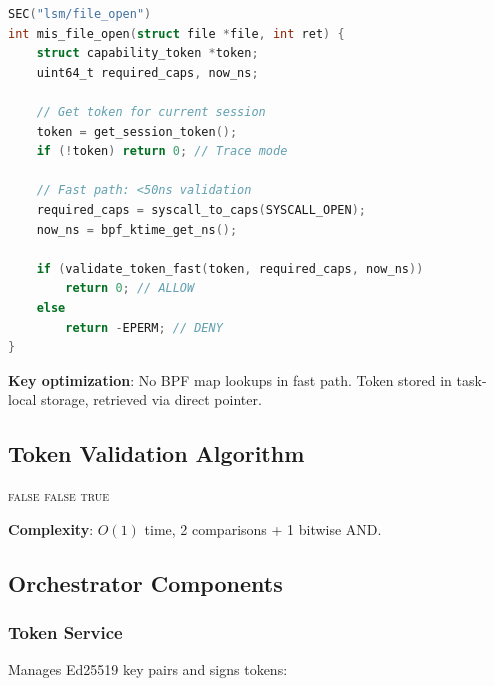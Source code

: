 \documentclass[11pt,a4paper]{article}
\begin{document}
\begin{lstlisting}[language=C, caption=Main enforcement logic]
SEC("lsm/file_open")
int mis_file_open(struct file *file, int ret) {
    struct capability_token *token;
    uint64_t required_caps, now_ns;
    
    // Get token for current session
    token = get_session_token();
    if (!token) return 0; // Trace mode
    
    // Fast path: <50ns validation
    required_caps = syscall_to_caps(SYSCALL_OPEN);
    now_ns = bpf_ktime_get_ns();
    
    if (validate_token_fast(token, required_caps, now_ns))
        return 0; // ALLOW
    else
        return -EPERM; // DENY
}
\end{lstlisting}

\textbf{Key optimization}: No BPF map lookups in fast path. Token stored in task-local storage, retrieved via direct pointer.

\subsection{Token Validation Algorithm}

\begin{algorithm}
\caption{Fast Token Validation}
\begin{algorithmic}[1]
        \State \Return \textsc{false} 
    \EndIf
        \State \Return \textsc{false} 
    \EndIf
    \State \Return \textsc{true} 
\EndProcedure
\end{algorithmic}
\end{algorithm}

\textbf{Complexity}: $O(1)$ time, 2 comparisons + 1 bitwise AND.

\subsection{Orchestrator Components}

\subsubsection{Token Service}

Manages Ed25519 key pairs and signs tokens:
\end{document}

